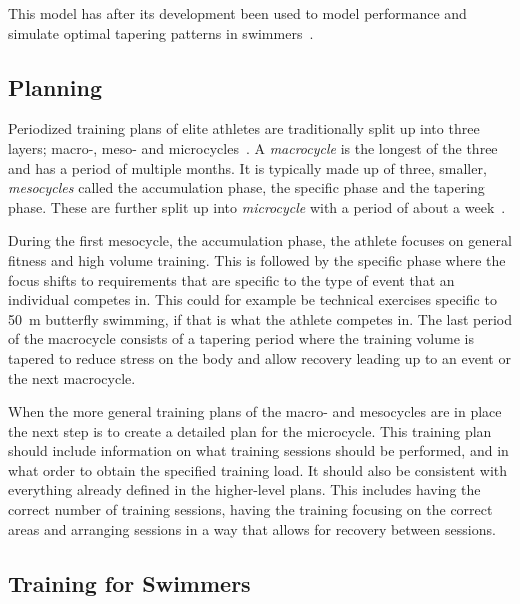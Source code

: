 This model has after its development been used to model performance and simulate optimal tapering patterns in swimmers~\cite{thomas2008model, thomas2009computer}.

\subsection{Planning}
Periodized training plans of elite athletes are traditionally split up into three layers; macro-, meso- and microcycles~\cite{bompa1983theory}.
A \textit{macrocycle} is the longest of the three and has a period of multiple months.
It is typically made up of three, smaller, \textit{mesocycles} called the accumulation phase, the specific phase and the tapering phase.
These are further split up into \textit{microcycle} with a period of about a week~\cite{smith2003framework}.

During the first mesocycle, the accumulation phase, the athlete focuses on general fitness and high volume training.
This is followed by the specific phase where the focus shifts to requirements that are specific to the type of event that an individual competes in.
This could for example be technical exercises specific to \SI{50}{\meter} butterfly swimming, if that is what the athlete competes in.
The last period of the macrocycle consists of a tapering period where the training volume is tapered to reduce stress on the body and allow recovery leading up to an event or the next macrocycle.

When the more general training plans of the macro- and mesocycles are in place the next step is to create a detailed plan for the microcycle. 
This training plan should include information on what training sessions should be performed, and in what order to obtain the specified training load.
It should also be consistent with everything already defined in the higher-level plans.
This includes having the correct number of training sessions, having the training focusing on the correct areas and arranging sessions in a way that allows for recovery between sessions.

\subsection{Training for Swimmers}


